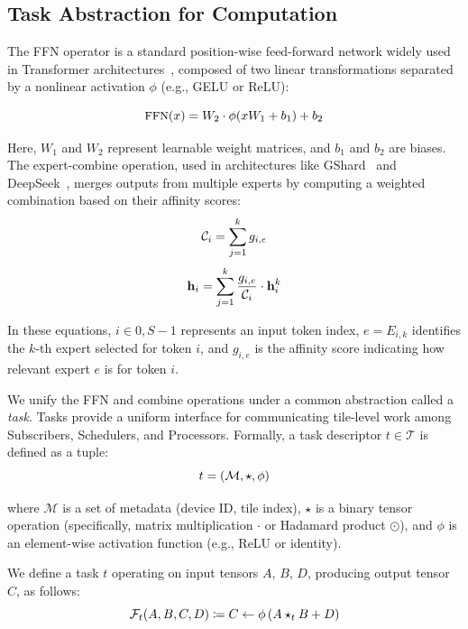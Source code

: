 \subsection{Task Abstraction for Computation}

The FFN operator is a standard position-wise feed-forward network widely used in Transformer architectures~\cite{NIPS2017_3f5ee243}, composed of two linear transformations separated by a nonlinear activation $\phi$ (e.g., GELU or ReLU):

\begin{equation}\label{eq:ffn}
    \small
\textrm{FFN}(x) = W_2 \cdot \phi(x W_1 + b_1) + b_2
\end{equation}

Here, $W_1$ and $W_2$ represent learnable weight matrices, and $b_1$ and $b_2$ are biases.
The expert-combine operation, used in architectures like GShard~\cite{DBLP:conf/iclr/LepikhinLXCFHKS21} and DeepSeek~\cite{deepep}, merges outputs from multiple experts by computing a weighted combination based on their affinity scores:
\begin{equation}\label{eq:combine1}\small
\mathcal{C}_i = \sum\limits_{j = 1}^k g_{i, e}
\end{equation}
\begin{equation}\label{eq:combine2}\small
\mathbf{h}_i = \sum\limits_{j = 1}^k \frac{g_{i, e}}{\mathcal{C}_i}\cdot \mathbf{h}_i^k
\end{equation}

In these equations, $i \in {0, S - 1}$ represents an input token index, $e = E_{i,k}$ identifies the $k$-th expert selected for token $i$, and $g_{i,e}$ is the affinity score indicating how relevant expert $e$ is for token $i$.

We unify the FFN and combine operations under a common abstraction called a \emph{task}. Tasks provide a uniform interface for communicating tile-level work among Subscribers, Schedulers, and Processors. Formally, a task descriptor $t \in \mathcal{T}$ is defined as a tuple:
\[\small
    t = (\mathcal{M}, \star, \phi)
\]

where $\mathcal{M}$ is a set of metadata (\eg  device ID, tile index), $\star$ is a binary tensor operation (specifically, matrix multiplication $\cdot$ or Hadamard product $\odot$), and $\phi$ is an element-wise activation function (e.g., ReLU or identity). 

We define a task $t$ operating on input tensors $A$, $B$, $D$, producing output tensor $C$, as follows:
\begin{equation}\label{eq:task_def}\small
    \mathcal{F}_t(A, B, C, D) \coloneqq C \gets \phi\left(A \star_t B + D\right)
\end{equation}

